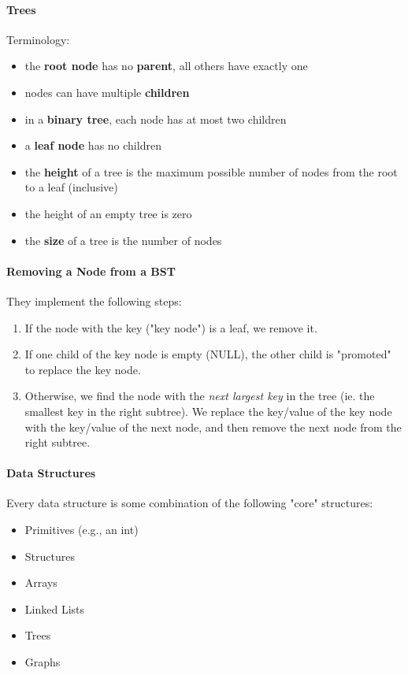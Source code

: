 \documentclass[10pt,letter]{article}
\begin{document}
{\paragraph{Trees} Terminology: \begin{itemize}
    \item the \textbf{root node} has no \textbf{parent}, all others have exactly one
    \item nodes can have multiple \textbf{children}
    \item in a \textbf{binary tree}, each node has at most two children
    \item a \textbf{leaf node} has no children
    \item the \textbf{height} of a tree is the maximum possible number of nodes from the root to a leaf (inclusive)
    \item the height of an empty tree is zero
    \item the \textbf{size} of a tree is the number of nodes
\end{itemize}

\paragraph{Removing a Node from a BST} They implement the following steps: \begin{enumerate}
    \item If the node with the key ("key node") is a leaf, we remove it. 
    \item If one child of the key node is empty (NULL), the other child is "promoted" to replace the key node. 
    \item Otherwise, we find the node with the \textit{next largest key} in the tree (ie. the smallest key in the right subtree). We replace the key/value of the key node with the key/value of the next node, and then remove the next node from the right subtree. 
\end{enumerate}

\paragraph{Data Structures} Every data structure is some combination of the following "core" structures: 
\begin{itemize}
    \item Primitives (e.g., an int)
    \item Structures 
    \item Arrays 
    \item Linked Lists 
    \item Trees 
    \item Graphs 
\end{itemize}

}
\end{document}
